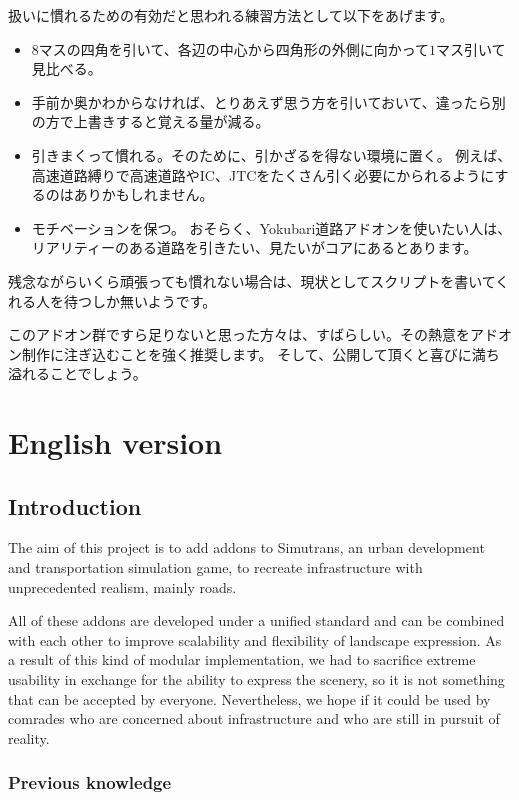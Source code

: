 \documentclass{jbook}
\begin{document}
扱いに慣れるための有効だと思われる練習方法として以下をあげます。
\begin{itemize}
  \item
  $8$マスの四角を引いて、各辺の中心から四角形の外側に向かって$1$マス引いて見比べる。
  \item
  手前か奥かわからなければ、とりあえず思う方を引いておいて、違ったら別の方で上書きすると覚える量が減る。
  \item
  引きまくって慣れる。そのために、引かざるを得ない環境に置く。
  例えば、高速道路縛りで高速道路やIC、JTCをたくさん引く必要にかられるようにするのはありかもしれません。
  \item
  モチベーションを保つ。
  おそらく、Yokubari道路アドオンを使いたい人は、リアリティーのある道路を引きたい、見たいがコアにあるとあります。
\end{itemize}
残念ながらいくら頑張っても慣れない場合は、現状としてスクリプトを書いてくれる人を待つしか無いようです。

\vspace{15pt}
このアドオン群ですら足りないと思った方々は、すばらしい。その熱意をアドオン制作に注ぎ込むことを強く推奨します。
そして、公開して頂くと喜びに満ち溢れることでしょう。

\newpage

\chapter{English version}

\section{Introduction}

The aim of this project is to add addons to Simutrans, an urban development and transportation simulation game, to recreate infrastructure with unprecedented realism, mainly roads.

All of these addons are developed under a unified standard and can be combined with each other to improve scalability and flexibility of landscape expression.
As a result of this kind of modular implementation, we had to sacrifice extreme usability in exchange for the ability to express the scenery, so it is not something that can be accepted by everyone.
Nevertheless, we hope if it could be used by comrades who are concerned about infrastructure and who are still in pursuit of reality.

\subsection*{Previous knowledge}
\end{document}
